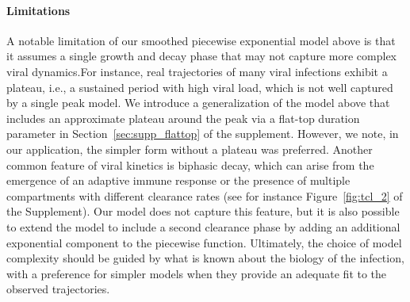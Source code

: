 \documentclass[12pt]{article}
\begin{document}
\paragraph{Limitations} A notable limitation of our smoothed piecewise exponential model above is that it assumes a single growth and decay phase that may not capture more complex viral dynamics.For instance, real trajectories of many viral infections exhibit a plateau, i.e., a sustained period with high viral load, which is not well captured by a single peak model. We introduce a generalization of the model above that includes an approximate plateau around the peak via a flat-top duration parameter in Section~\ref{sec:supp_flattop} of the supplement. However, we note, in our application, the simpler form without a plateau was preferred. Another common feature of viral kinetics is biphasic decay, which can arise from the emergence of an adaptive immune response or the presence of multiple compartments with different clearance rates (see for instance Figure~\ref{fig:tcl_2} of the Supplement). Our model does not capture this feature, but it is also possible to extend the model to include a second clearance phase by adding an additional exponential component to the piecewise function. Ultimately, the choice of model complexity should be guided by what is known about the biology of the infection, with a preference for simpler models when they provide an adequate fit to the observed trajectories.
\end{document}
